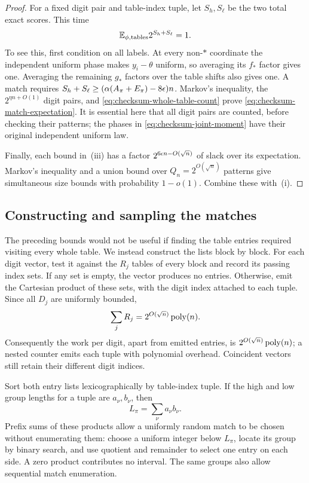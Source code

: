 \begin{proof}
For a fixed digit pair and table-index tuple, let $S_h,S_\ell$ be the
two total exact scores.  This time
\begin{equation}
 \mathbb E_{\phi,\text{tables}}2^{S_h+S_\ell}=1.
 \label{eq:checksum-joint-moment}
\end{equation}
To see this, first condition on all labels.  At every non-$*$
coordinate the independent uniform phase makes $y_i-\theta$ uniform,
so averaging its $f_*$ factor gives one.  Averaging the remaining
$g_*$ factors over the table shifts also gives one.
A match requires
$S_h+S_\ell\ge(\alpha(A_\pi+E_\pi)-8\epsilon)n$.
Markov's inequality, the $2^{\eta n+O(1)}$ digit pairs, and
\eqref{eq:checksum-whole-table-count} prove
\eqref{eq:checksum-match-expectation}.
It is essential here that all digit pairs are counted, before checking
their patterns; the phases in \eqref{eq:checksum-joint-moment} have
their original independent uniform law.

Finally, each bound in~\textup{(iii)} has a factor
$2^{6\epsilon n-O(\sqrt n)}$ of slack over its expectation.
Markov's inequality and a union bound over
$Q_n=2^{O(\sqrt n)}$ patterns give simultaneous size bounds with
probability $1-o(1)$.  Combine these with~\textup{(i)}.
\end{proof}

\subsection{Constructing and sampling the matches}

The preceding bounds would not be useful if finding the table entries
required visiting every whole table.  We instead construct the lists
block by block.  For each digit vector, test it against the $R_j$ tables
of every block and record its passing index sets.  If any set is empty,
the vector produces no entries.  Otherwise, emit the Cartesian product
of these sets, with the digit index attached to each tuple.
Since all $D_j$ are uniformly bounded,
\[
 \sum_jR_j=2^{O(\sqrt n)}\operatorname{poly}(n).
\]
Consequently the work per digit, apart from emitted entries, is
$2^{O(\sqrt n)}\operatorname{poly}(n)$; a nested counter emits each tuple with
polynomial overhead.  Coincident vectors still retain their different
digit indices.

Sort both entry lists lexicographically by table-index tuple.  If the
high and low group lengths for a tuple are $a_\nu,b_\nu$, then
\begin{equation}
 L_\pi=\sum_\nu a_\nu b_\nu.
 \label{eq:checksum-match-count}
\end{equation}
Prefix sums of these products allow a uniformly random match to be
chosen without enumerating them: choose a uniform integer below
$L_\pi$, locate its group by binary search, and use quotient and
remainder to select one entry on each side.  A zero product contributes
no interval.  The same groups also allow sequential match enumeration.

